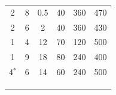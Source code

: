 \begin{table}[hbt]
\begin{subtable}{0.5\linewidth}
\begin{tabular}{cccccc}
			\hline
	2	&8	&0.5	&40	&360	&470	\\
	2	&6	&2	&40	&360	&430	\\
	1	&4	&12	&70	&120	&500	\\
	1	&9	&18	&80	&240	&400	\\
	4$^*$	&6	&14	&60	&240	&500	\\
			\hline
			\hline
			\\ \\  \\
		\end{tabular}
	\end{subtable}
\end{table}

